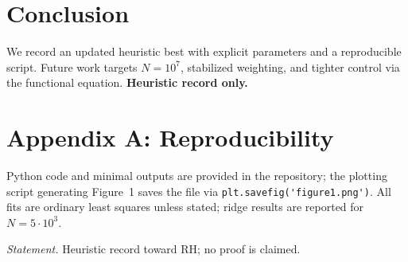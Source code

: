 \documentclass[11pt]{article}
\begin{document}
\section{Conclusion}
We record an updated heuristic best with explicit parameters and a reproducible script. Future work targets \(N=10^7\), stabilized weighting, and tighter control via the functional equation. \textbf{Heuristic record only.}

\appendix
\section*{Appendix A: Reproducibility}
Python code and minimal outputs are provided in the repository; the plotting script generating Figure~1 saves the file via \verb|plt.savefig('figure1.png')|. All fits are ordinary least squares unless stated; ridge results are reported for \(N=5\cdot10^3\).

\bigskip
\noindent\textit{Statement.} Heuristic record toward RH; no proof is claimed.
\end{document}
